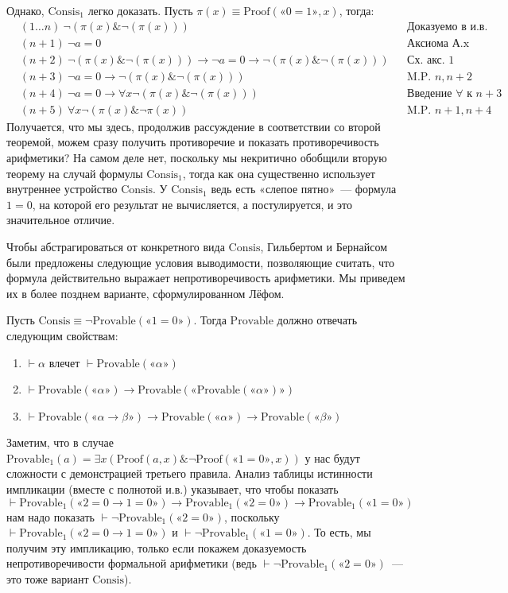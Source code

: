 \documentclass[a4paper,11pt]{article}
\theoremstyle{definition}
\newcommand{\proves}{\vdash}
\newcommand{\amp}{\mathbin{\&}}
\newcommand{\gn}[1]{\text{«}#1\text{»}}
\begin{document}
Однако, $\mathrm{Consis}_1$ легко доказать. Пусть $\pi(x) \equiv
\mathrm{Proof}(\gn{0 = 1}, x)$, тогда:
\begin{align*}
&(1\dots n)\ \neg(\pi(x) \amp \neg(\pi(x))) &&\text{Доказуемо в и.в.}\\
&(n+1)\ \neg a = 0 &&\text{Аксиома А.x}\\
&(n+2)\ \neg(\pi(x) \amp \neg(\pi(x))) \to \neg a = 0 \to \neg(\pi(x) \amp \neg(\pi(x))) &&\text{Сх. акс. 1}\\
&(n+3)\ \neg a = 0 \to \neg(\pi(x) \amp \neg(\pi(x))) &&\text{M.P. } n, n+2\\
&(n+4)\ \neg a = 0 \to \forall x\neg(\pi(x) \amp \neg(\pi(x))) &&\text{Введение } \forall \text{ к } n+3\\
&(n+5)\ \forall x\neg(\pi(x) \amp \neg\pi(x)) &&\text{M.P. } n+1, n+4
\end{align*}
Получается, что мы здесь, продолжив рассуждение в соответствии со второй
теоремой, можем сразу получить противоречие и показать противоречивость
арифметики? На самом деле нет, поскольку мы некритично обобщили вторую теорему
на случай формулы $\mathrm{Consis}_1$, тогда как она существенно использует
внутреннее устройство $\mathrm{Consis}$. У $\mathrm{Consis}_1$ ведь есть
«слепое пятно»~--- формула $1 = 0$, на которой его результат не вычисляется, а
постулируется, и это значительное отличие.

Чтобы абстрагироваться от конкретного вида $\mathrm{Consis}$, Гильбертом и
Бернайсом были предложены следующие условия выводимости, позволяющие считать,
что формула действительно выражает непротиворечивость арифметики. Мы приведем их
в более позднем варианте, сформулированном Лёфом.

Пусть $\mathrm{Consis} \equiv \neg\mathrm{Provable}(\gn{1 = 0})$. Тогда
$\mathrm{Provable}$ должно отвечать следующим свойствам:
\begin{enumerate}
\item $\proves \alpha$ влечет $\proves \mathrm{Provable}(\gn{\alpha})$
\item $\proves \mathrm{Provable}(\gn{\alpha}) \to
  \mathrm{Provable}(\gn{\mathrm{Provable}(\gn{\alpha})})$
\item $\proves \mathrm{Provable}(\gn{\alpha \to \beta}) \to
  \mathrm{Provable}(\gn{\alpha}) \to \mathrm{Provable}(\gn{\beta})$
\end{enumerate}

Заметим, что в случае $\mathrm{Provable}_1(a) = \exists x(\mathrm{Proof}(a, x)
\amp \neg\mathrm{Proof}(\gn{1 = 0}, x))$ у нас будут сложности с демонстрацией
третьего правила. Анализ таблицы истинности импликации (вместе с полнотой и.в.)
указывает, что чтобы показать
\[ \proves \mathrm{Provable}_1(\gn{2 = 0 \to 1 = 0}) \to \mathrm{Provable}_1(\gn{2 = 0}) \to \mathrm{Provable}_1(\gn{1 = 0}) \]
нам надо показать $\proves \neg\mathrm{Provable}_1(\gn{2 = 0})$, поскольку
$\proves \mathrm{Provable}_1(\gn{2 = 0 \to 1 = 0})$ и $\proves
\neg\mathrm{Provable}_1(\gn{1 = 0})$. То есть, мы получим эту импликацию, только
если покажем доказуемость непротиворечивости формальной арифметики (ведь
$\proves \neg\mathrm{Provable}_1(\gn{2 = 0})$~--- это тоже вариант
$\mathrm{Consis}$).
\end{document}
